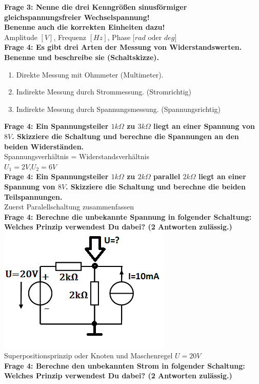 \documentclass[11pt,a4paper]{scrartcl}
\begin{document}
\textbf{Frage 3: Nenne die drei Kenngrößen sinusförmiger gleichspannungsfreier Wechselspannung!\\
Benenne auch die korrekten Einheiten dazu!}\\
Amplitude $[V]$, Frequenz $[Hz]$, Phase $[rad$ oder $deg]$\\
\textbf{Frage 4: Es gibt drei Arten der Messung von Widerstandswerten. Benenne und beschreibe sie (Schaltskizze).}
\begin{enumerate}
	\item Direkte Messung mit Ohmmeter (Multimeter).
	\item Indirekte Messung durch Strommessung. (Stromrichtig)
	\item Indirekte Messung durch Spannungsmessung. (Spannungsrichtig)
\end{enumerate}
\textbf{Frage 4: Ein Spannungsteiler $1k\Omega$ zu $3k\Omega$ liegt an einer Spannung von $8V$. Skizziere die Schaltung und berechne die Spannungen an den beiden Widerständen.}\\
Spannungsverhältnis = Widerstandsverhältnis\\
$U_1=2V$,$U_2=6V$\\
\textbf{Frage 4: Ein Spannungsteiler $1k\Omega$ zu $2k\Omega$ parallel $2k\Omega$ liegt an einer Spannung von $8V$. Skizziere die Schaltung und berechne die beiden Teilspannungen.}\\
Zuerst Paralellschaltung zusammenfassen\\
\textbf{Frage 4: Berechne die unbekannte Spannung in folgender Schaltung: Welches Prinzip verwendest Du dabei? (2 Antworten zulässig.)}\\
\includegraphics[height=6cm,keepaspectratio]{Spannung_berechnen.png}\\
Superpositionsprinzip oder Knoten und Maschenregel $U=20V$\\
\textbf{Frage 4: Berechne den unbekannten Strom in folgender Schaltung: Welches Prinzip verwendest Du dabei? (2 Antworten zulässig.)}\\
\end{document}
